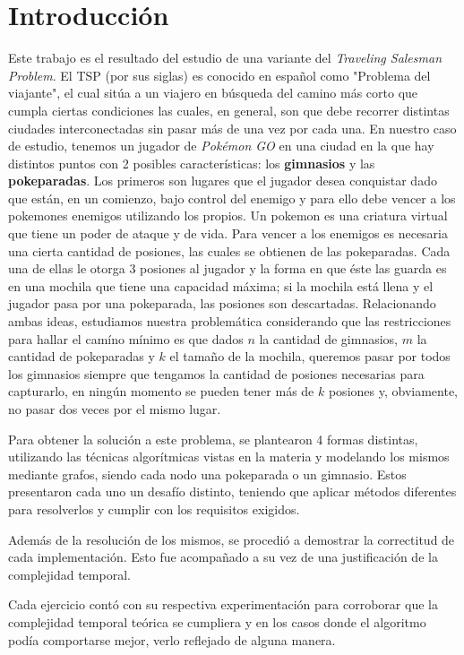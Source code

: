 \section{Introducción}

Este trabajo es el resultado del estudio de una variante del \textit{Traveling Salesman Problem}. El TSP (por sus siglas) es conocido en español como "Problema del viajante", el cual sitúa a un viajero en búsqueda del camino más corto que cumpla ciertas condiciones las cuales, en general, son que debe recorrer distintas ciudades interconectadas sin pasar más de una vez por cada una. En nuestro caso de estudio, tenemos un jugador de \textit{Pokémon GO} en una ciudad en la que hay distintos puntos con 2 posibles características: los \textbf{gimnasios} y las \textbf{pokeparadas}. Los primeros son lugares que el jugador desea conquistar dado que están, en un comienzo, bajo control del enemigo y para ello debe vencer a los pokemones enemigos utilizando los propios. Un pokemon es una criatura virtual que tiene un poder de ataque y de vida. Para vencer a los enemigos es necesaria una cierta cantidad de posiones, las cuales se obtienen de las pokeparadas. Cada una de ellas le otorga 3 posiones al jugador y la forma en que éste las guarda es en una mochila que tiene una capacidad máxima; si la mochila está llena y el jugador pasa por una pokeparada, las posiones son descartadas. Relacionando ambas ideas, estudiamos nuestra problemática considerando que las restricciones para hallar el camíno mínimo es que dados $n$ la cantidad de gimnasios, $m$ la cantidad de pokeparadas y $k$ el tamaño de la mochila, queremos pasar por todos los gimnasios siempre que tengamos la cantidad de posiones necesarias para capturarlo, en ningún momento se pueden tener más de $k$ posiones y, obviamente, no pasar dos veces por el mismo lugar.

Para obtener la solución a este problema, se plantearon 4 formas distintas, utilizando las técnicas algorítmicas vistas en la materia y modelando los mismos mediante grafos, siendo cada nodo una pokeparada o un gimnasio. Estos presentaron cada uno un desafío distinto, teniendo que aplicar métodos diferentes para resolverlos y cumplir con los requisitos exigidos.

Además de la resolución de los mismos, se procedió a demostrar la correctitud de
cada implementación. Esto fue acompañado a su vez de una justificación de la
complejidad temporal.

Cada ejercicio contó con su respectiva experimentación para corroborar que la
complejidad temporal teórica se cumpliera y en los casos donde el algoritmo
podía comportarse mejor, verlo reflejado de alguna manera.


